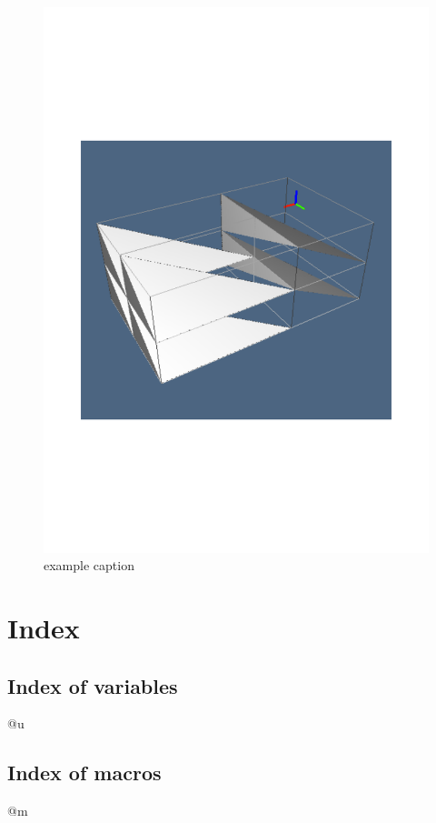 \documentclass[11pt,oneside]{article}	%
\begin{document}
\begin{figure}[htbp] %
   \centering
   \includegraphics[width=0.6\linewidth]{images/fig1} 
   \caption{example caption}
   \label{fig:example}
\end{figure}

\section{Index}
\subsection*{Index of variables}
@u

\subsection*{Index of macros}
@m




        
\appendix
\end{document}
